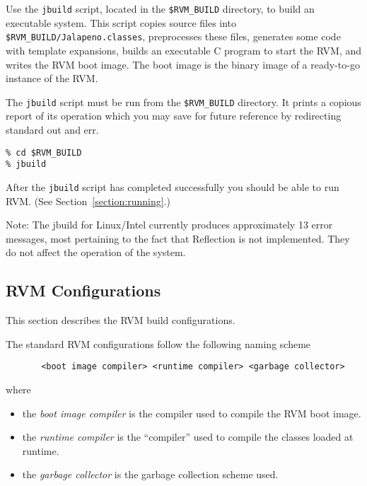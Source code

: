 \begin{enumerate}
Use the {\tt jbuild} script, located in the {\tt \$RVM\_BUILD} directory,
to build an executable system.  This script copies source files into
{\tt \$RVM\_BUILD/Jalapeno.classes}, preprocesses these files, generates
some code with template expansions, builds an executable C program to
start the RVM, and writes the RVM boot image.  The boot image is the
binary image of a ready-to-go instance of the RVM.

The {\tt jbuild} script must be run from the {\tt \$RVM\_BUILD}
directory. It prints a copious report of its operation which you may
save for future reference by redirecting standard out and err.

\begin{verbatim}
% cd $RVM_BUILD
% jbuild
\end{verbatim}


After the {\tt jbuild} script has completed successfully you should be able 
to run RVM.  (See Section~\ref{section:running}.)

Note: The jbuild for Linux/Intel currently produces approximately 13 error
messages, most pertaining to the fact that Reflection is not implemented.
They do not affect the operation of the system.

\end{enumerate}

\subsection{RVM Configurations}\label{configs}

This section describes the RVM build configurations.

The standard RVM configurations follow the following naming scheme
\begin{verbatim}
       <boot image compiler> <runtime compiler> <garbage collector>
\end{verbatim}

where
\begin{itemize}
\item the {\em boot image compiler} is the compiler used to compile the RVM boot image.
\item the {\em runtime compiler} is the ``compiler'' used to compile
the classes loaded at runtime.  
\item the {\em garbage collector} is the garbage collection scheme used.
\end{itemize}

